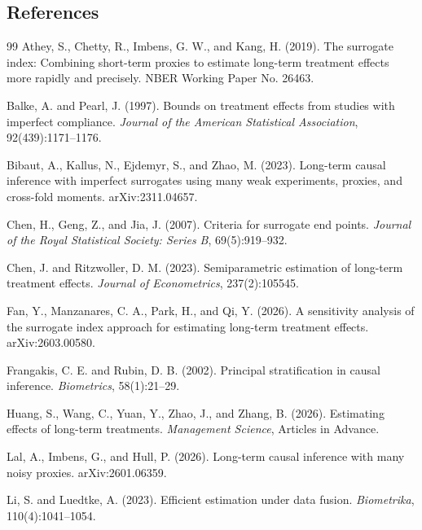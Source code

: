 \documentclass[11pt]{article}
\theoremstyle{definition}
\theoremstyle{plain}
\theoremstyle{remark}
\begin{document}
\subsection*{References}
\begin{thebibliography}{99}
Athey, S., Chetty, R., Imbens, G. W., and Kang, H. (2019).
\newblock The surrogate index: Combining short-term proxies to estimate long-term treatment effects more rapidly and precisely.
\newblock NBER Working Paper No. 26463.

Balke, A. and Pearl, J. (1997).
\newblock Bounds on treatment effects from studies with imperfect compliance.
\newblock \emph{Journal of the American Statistical Association}, 92(439):1171--1176.

Bibaut, A., Kallus, N., Ejdemyr, S., and Zhao, M. (2023).
\newblock Long-term causal inference with imperfect surrogates using many weak experiments, proxies, and cross-fold moments.
\newblock arXiv:2311.04657.

Chen, H., Geng, Z., and Jia, J. (2007).
\newblock Criteria for surrogate end points.
\newblock \emph{Journal of the Royal Statistical Society: Series B}, 69(5):919--932.

Chen, J. and Ritzwoller, D. M. (2023).
\newblock Semiparametric estimation of long-term treatment effects.
\newblock \emph{Journal of Econometrics}, 237(2):105545.

Fan, Y., Manzanares, C. A., Park, H., and Qi, Y. (2026).
\newblock A sensitivity analysis of the surrogate index approach for estimating long-term treatment effects.
\newblock arXiv:2603.00580.

Frangakis, C. E. and Rubin, D. B. (2002).
\newblock Principal stratification in causal inference.
\newblock \emph{Biometrics}, 58(1):21--29.

Huang, S., Wang, C., Yuan, Y., Zhao, J., and Zhang, B. (2026).
\newblock Estimating effects of long-term treatments.
\newblock \emph{Management Science}, Articles in Advance.

Lal, A., Imbens, G., and Hull, P. (2026).
\newblock Long-term causal inference with many noisy proxies.
\newblock arXiv:2601.06359.

Li, S. and Luedtke, A. (2023).
\newblock Efficient estimation under data fusion.
\newblock \emph{Biometrika}, 110(4):1041--1054.


\end{thebibliography}
\end{document}
